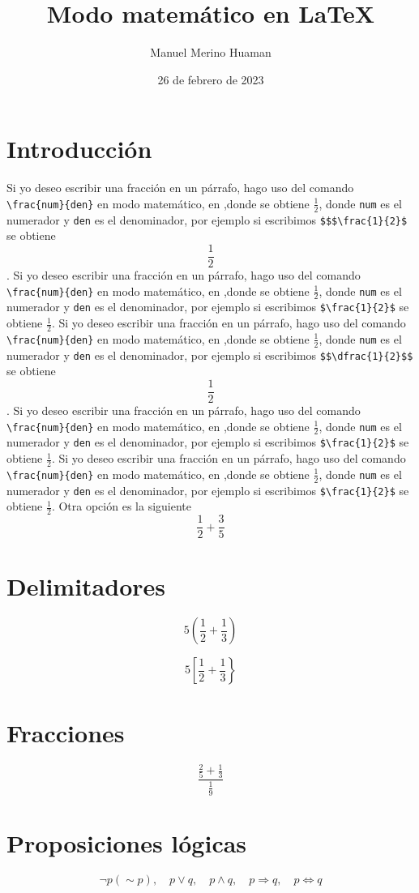 \documentclass[a4paper, 11pt]{article}
\author{Manuel Merino Huaman}
\title{Modo matemático en \LaTeX}
\date{26 de febrero de 2023}
\begin{document}
\maketitle

\section{Introducción}
    Si yo deseo escribir una fracción en un párrafo, hago uso del comando \verb|\frac{num}{den}| en modo matemático, en ,donde se obtiene $\frac{1}{2}$, donde \verb|num| es el numerador y \verb|den| es el denominador, por ejemplo si escribimos \verb|$$$\frac{1}{2}$| se obtiene $$\frac{1}{2}$$.
    Si yo deseo escribir una fracción en un párrafo, hago uso del comando \verb|\frac{num}{den}| en modo matemático, en ,donde se obtiene $\frac{1}{2}$, donde \verb|num| es el numerador y \verb|den| es el denominador, por ejemplo si escribimos \verb|$\frac{1}{2}$| se obtiene $\frac{1}{2}$.
    Si yo deseo escribir una fracción en un párrafo, hago uso del comando \verb|\frac{num}{den}| en modo matemático, en ,donde se obtiene $\frac{1}{2}$, donde \verb|num| es el numerador y \verb|den| es el denominador, por ejemplo si escribimos \verb|$$\dfrac{1}{2}$$| se obtiene $$\dfrac{1}{2}$$.
    Si yo deseo escribir una fracción en un párrafo, hago uso del comando \verb|\frac{num}{den}| en modo matemático, en ,donde se obtiene $\frac{1}{2}$, donde \verb|num| es el numerador y \verb|den| es el denominador, por ejemplo si escribimos \verb|$\frac{1}{2}$| se obtiene $\frac{1}{2}$.
    Si yo deseo escribir una fracción en un párrafo, hago uso del comando \verb|\frac{num}{den}| en modo matemático, en ,donde se obtiene $\frac{1}{2}$, donde \verb|num| es el numerador y \verb|den| es el denominador, por ejemplo si escribimos \verb|$\frac{1}{2}$| se obtiene $\frac{1}{2}$. Otra opción es la siguiente $$ \frac{1}{2} + \frac{3}{5}$$
    
   \section{Delimitadores}
      $$5(\frac{1}{2} + \frac{1}{3})$$
      
      $$5\left[\frac{1}{2} + \frac{1}{3}\right\}$$
   \section{Fracciones}
      $$ \dfrac{\frac{2}{5} + \frac{1}{3}}{\frac{1}{9}}$$

   \section{Proposiciones lógicas}
      $$ \neg p (\sim p), \quad p \vee q, \quad p \wedge q, \quad p \Rightarrow q, \quad p \Leftrightarrow q $$
\end{document}
